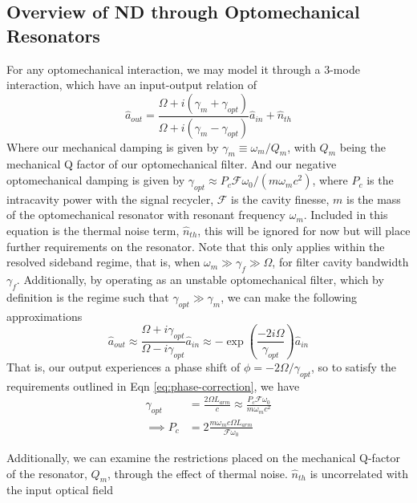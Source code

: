\documentclass[aps,
                pra,  
                a4paper, 
                amsmath, 
                amssymb, 
                preprint,
                amsfonts,
                nofootinbib,
                titlepage
            ]{revtex4-2}
\begin{document}
    \subsection{Overview of ND through Optomechanical Resonators}
    For any optomechanical interaction, we may model it through a 3-mode interaction, which have an input-output relation of
    \begin{equation}
        \label{eq:3-mode-in-out}
        \hat{a}_{out}=\frac{\Omega+i(\gamma_m+\gamma_{opt})}{\Omega+i(\gamma_m-\gamma_{opt})}\hat{a}_{in} + \hat{n}_{th}
    \end{equation}
    Where our mechanical damping is given by $\gamma_m\equiv\omega_m/Q_m$, with $Q_m$ being the mechanical Q factor of our optomechanical filter. And our negative optomechanical damping is given by $\gamma_{opt}\approx P_c\mathcal{F}\omega_0/(m\omega_m c^2)$, where $P_c$ is the intracavity power with the signal recycler, $\mathcal{F}$ is the cavity finesse, $m$ is the mass of the optomechanical resonator with resonant frequency $\omega_m$. Included in this equation is the thermal noise term, $\hat{n}_{th}$, this will be ignored for now but will place further requirements on the resonator. Note that this only applies within the resolved sideband regime, that is, when $\omega_m\gg\gamma_f\gg\Omega$, for filter cavity bandwidth $\gamma_f$. Additionally, by operating as an unstable optomechanical filter, which by definition is the regime such that $\gamma_{opt}\gg\gamma_m$, we can make the following approximations
    \begin{equation}
        \label{eq:in-out-approx}
        \hat{a}_{out}\approx\frac{\Omega+i\gamma_{opt}}{\Omega-i\gamma_{opt}}\hat{a}_{in}\approx-\exp{\left(\frac{-2i\Omega}{\gamma_{opt}}\right)}\hat{a}_{in}
    \end{equation}
    That is, our output experiences a phase shift of $\phi=-2\Omega/\gamma_{opt}$, so to satisfy the requirements outlined in Eqn \eqref{eq:phase-correction}, we have
    \begin{align}
        \label{eq:gamma-opt-req}
        \gamma_{opt}&=\frac{2\Omega L_{arm}}{c}\approx\frac{P_c\mathcal{F}\omega_0}{m\omega_m c^2}\\
        \label{eq:filter-power-req}
        \implies P_c&=2\frac{m\omega_m c \Omega L_{arm}}{\mathcal{F}\omega_0}
    \end{align}
    \par
    Additionally, we can examine the restrictions placed on the mechanical Q-factor of the resonator, $Q_m$, through the effect of thermal noise. $\hat{n}_{th}$ is uncorrelated with the input optical field %
\end{document}
